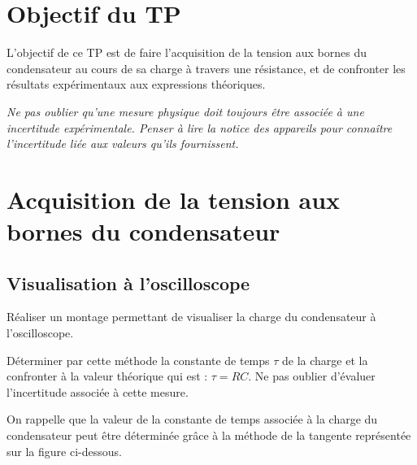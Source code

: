 \documentclass{tp}
\begin{document}

\section{Objectif du TP}
L'objectif de ce TP est de faire l'acquisition de la tension aux bornes du condensateur au cours de sa charge à travers une résistance, et de confronter les résultats expérimentaux aux expressions théoriques.

\vspace{1em}
\textit{Ne pas oublier qu'une mesure physique doit toujours être associée à une incertitude expérimentale. Penser à lire la notice des appareils pour connaître l'incertitude liée aux valeurs qu'ils fournissent.}

\section{Acquisition de la tension aux bornes du condensateur}
\subsection{Visualisation à l'oscilloscope}
Réaliser un montage permettant de visualiser la charge du condensateur à l'oscilloscope.

Déterminer par cette méthode la constante de temps $\tau$ de la charge et la confronter à la valeur théorique qui est : $\tau=RC$. Ne pas oublier d'évaluer l'incertitude associée à cette mesure.

On rappelle que la valeur de la constante de temps associée à la charge du condensateur peut être déterminée grâce à la méthode de la tangente représentée sur la figure ci-dessous.
\begin{center}
\end{center}
\end{document}
